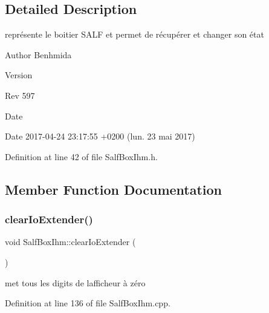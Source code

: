\subsection{Detailed Description}
représente le boitier S\+A\+LF et permet de récupérer et changer son état 

\begin{DoxyAuthor}{Author}
Benhmida 
\end{DoxyAuthor}
\begin{DoxyVersion}{Version}

\end{DoxyVersion}
\begin{DoxyParagraph}{Rev}
597 
\end{DoxyParagraph}
\begin{DoxyDate}{Date}

\end{DoxyDate}
\begin{DoxyParagraph}{Date}
2017-\/04-\/24 23\+:17\+:55 +0200 (lun. 23 mai 2017) 
\end{DoxyParagraph}


Definition at line 42 of file Salf\+Box\+Ihm.\+h.



\subsection{Member Function Documentation}
\mbox{\label{class_salf_box_ihm_a1d898e4cc39968da624912a2abd0ebe9}} 
\subsubsection{\texorpdfstring{clear\+Io\+Extender()}{clearIoExtender()}}
{\footnotesize\ttfamily void Salf\+Box\+Ihm\+::clear\+Io\+Extender (\begin{DoxyParamCaption}{ }\end{DoxyParamCaption})\hspace{0.3cm}{\ttfamily [static]}}



met tous les digits de l\textquotesingle{}afficheur à zéro 



Definition at line 136 of file Salf\+Box\+Ihm.\+cpp.

\mbox{\label{class_salf_box_ihm_a21fa5d5d54ae0e93285dd5a20f832eba}} 
